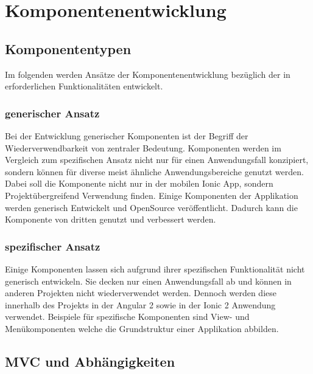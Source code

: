 \section{Komponentenentwicklung}

\subsection{Komponententypen}

Im folgenden werden Ansätze der Komponentenentwicklung bezüglich der in
\projectname{} erforderlichen Funktionalitäten entwickelt.


\subsubsection{generischer Ansatz}

Bei der Entwicklung generischer Komponenten ist der Begriff der Wiederverwendbarkeit von zentraler Bedeutung.
Komponenten werden im Vergleich zum spezifischen Ansatz nicht nur für einen Anwendungsfall konzipiert, sondern können
für diverse meist ähnliche Anwendungsbereiche genutzt werden. Dabei soll die Komponente nicht nur in der mobilen Ionic App,
sondern Projektübergreifend Verwendung finden. Einige Komponenten der Applikation \projectname{} werden
generisch Entwickelt und OpenSource veröffentlicht. Dadurch kann die Komponente von dritten genutzt und verbessert werden.


\subsubsection{spezifischer Ansatz}

Einige Komponenten lassen sich aufgrund ihrer spezifischen Funktionalität nicht generisch entwickeln.
Sie decken nur einen Anwendungsfall ab und können in anderen Projekten nicht wiederverwendet werden.
Dennoch werden diese innerhalb des Projekts \projectname{}
in der Angular 2 sowie in der Ionic 2 Anwendung verwendet.
Beispiele für spezifische Komponenten sind View- und Menükomponenten welche die Grundstruktur einer Applikation abbilden.

\subsection{MVC und Abhängigkeiten}

